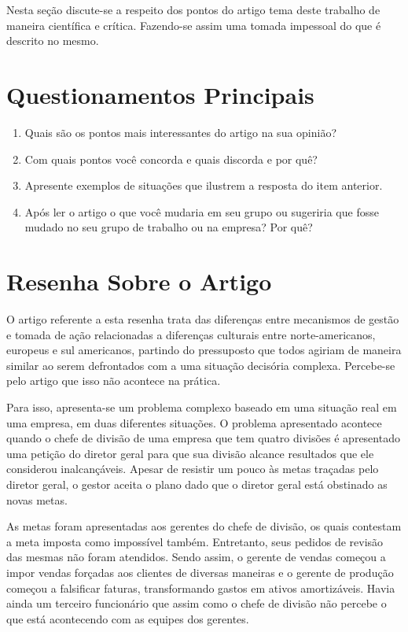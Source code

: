Nesta seção discute-se a respeito dos pontos do artigo tema deste trabalho de maneira
científica e crítica. Fazendo-se assim uma tomada impessoal do que é descrito no mesmo.

\section{Questionamentos Principais}
\begin{enumerate}
\item Quais são os pontos mais interessantes do artigo na sua opinião?
\item Com quais pontos você concorda e quais discorda e por quê?
\item Apresente exemplos de situações que ilustrem a resposta do item anterior.
\item Após ler o artigo o que você mudaria em seu grupo ou sugeriria que
fosse mudado no seu grupo de trabalho ou na empresa? Por quê?
\end{enumerate}

\section{Resenha Sobre o Artigo}

O artigo referente a esta resenha trata das diferenças entre mecanismos
de gestão e tomada de ação relacionadas a diferenças culturais entre
norte-americanos, europeus e sul americanos, partindo do pressuposto
que todos agiriam de maneira similar ao serem defrontados com a uma
situação decisória complexa. Percebe-se pelo artigo que isso não acontece
na prática. 

Para isso, apresenta-se um problema complexo baseado em uma situação
real em uma empresa, em duas diferentes situações. O problema apresentado
acontece quando o chefe de divisão de uma empresa que tem quatro divisões
é apresentado uma petição do diretor geral para que sua divisão alcance
resultados que ele considerou inalcançáveis. Apesar de resistir um
pouco às metas traçadas pelo diretor geral, o gestor aceita o plano
dado que o diretor geral está obstinado as novas metas.

As metas foram apresentadas aos gerentes do chefe de divisão, os quais
contestam a meta imposta como impossível também. Entretanto, seus
pedidos de revisão das mesmas não foram atendidos. Sendo assim, o
gerente de vendas começou a impor vendas forçadas aos clientes de
diversas maneiras e o gerente de produção começou a falsificar faturas,
transformando gastos em ativos amortizáveis. Havia ainda um terceiro
funcionário que assim como o chefe de divisão não percebe o que está
acontecendo com as equipes dos gerentes.

